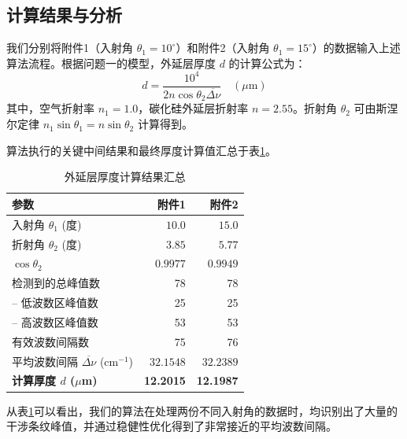 \documentclass[withoutpreface,bwprint]{cumcmthesis} %
\begin{document}
\subsection{计算结果与分析}
我们分别将附件1（入射角 $\theta_1 = 10^\circ$）和附件2（入射角 $\theta_1 = 15^\circ$）的数据输入上述算法流程。根据问题一的模型，外延层厚度 $d$ 的计算公式为：
\begin{equation}
    d = \frac{10^4}{2 n \cos\theta_2 \overline{\Delta\nu}} \quad (\mu\text{m})
\end{equation}
其中，空气折射率 $n_1=1.0$，碳化硅外延层折射率 $n=2.55$。折射角 $\theta_2$ 可由斯涅尔定律 $n_1 \sin\theta_1 = n \sin\theta_2$ 计算得到。

算法执行的关键中间结果和最终厚度计算值汇总于表\ref{tab:results_q2}。

\begin{table}[htbp]
    \centering
    \caption{外延层厚度计算结果汇总}
    \label{tab:results_q2}
    \begin{tabular}{lrr}
        \toprule
        \textbf{参数}                               & \textbf{附件1}     & \textbf{附件2}     \\
        \midrule
        入射角 $\theta_1$ (度)                        & $10.0$           & $15.0$           \\
        折射角 $\theta_2$ (度)                        & $3.85$           & $5.77$           \\
        $\cos\theta_2$                            & $0.9977$         & $0.9949$         \\
        检测到的总峰值数                                  & 78               & 78               \\
        \quad -- 低波数区峰值数                          & 25               & 25               \\
        \quad -- 高波数区峰值数                          & 53               & 53               \\
        有效波数间隔数                                   & 75               & 76               \\
        平均波数间隔 $\overline{\Delta\nu}$ (cm$^{-1}$) & $32.1548$        & $32.2389$        \\
        \textbf{计算厚度 $d$ ($\mu$m)}                & \textbf{12.2015} & \textbf{12.1987} \\
        \bottomrule
    \end{tabular}
\end{table}

从表\ref{tab:results_q2}可以看出，我们的算法在处理两份不同入射角的数据时，均识别出了大量的干涉条纹峰值，并通过稳健性优化得到了非常接近的平均波数间隔。
\end{document}
